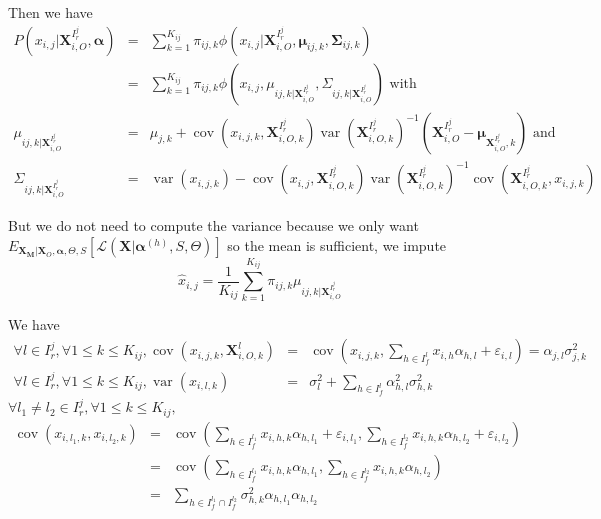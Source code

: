 \documentclass[11pt,a4paper]{report}
\begin{document}
Then we have 
\begin{eqnarray}
	P(x_{i,j}|\boldsymbol{X}_{i,O}^{I_r^j},\boldsymbol{\alpha})&= &\sum_{k=1}^{K_{ij}}\pi_{ij,k}\phi(x_{i,j}|\boldsymbol{X}_{i,O}^{I_r^j},\boldsymbol{\mu}_{ij,k},\boldsymbol{\Sigma}_{ij,k}) \\
	&=&\sum_{k=1}^{K_{ij}}\pi_{ij,k}\phi \left(x_{i,j},\mu_{ij,k|\boldsymbol{X}_{i,O}^{I_r^j}},\Sigma_{ij,k|\boldsymbol{X}_{i,O}^{I_r^j}}\right) \textrm{ with} \\
	\mu_{ij,k|\boldsymbol{X}_{i,O}^{I_r^j}}&=& \mu_{j,k} + \operatorname{cov}(x_{i,j,k},\boldsymbol{X}_{i,O,k}^{I_r^j})\operatorname{var}(\boldsymbol{X}_{i,O,k}^{I_r^j})^{-1}(\boldsymbol{X}_{i,O}^{I_r^j}-\boldsymbol{\mu}_{\boldsymbol{X}_{i,O}^{I_r^j},k})\textrm{ and} \\
	\Sigma_{ij,k|\boldsymbol{X}_{i,O}^{I_r^j}}&=&\operatorname{var}(x_{i,j,k})-\operatorname{cov}(x_{i,j},\boldsymbol{X}_{i,O,k}^{I_r^j})\operatorname{var}(\boldsymbol{X}_{i,O,k}^{I_r^j})^{-1}\operatorname{cov}(\boldsymbol{X}_{i,O,k}^{I_r^j},x_{i,j,k})
\end{eqnarray}
 
But we do not need to compute the variance because we only want $E_{\boldsymbol{X}_{\boldsymbol{M}}|\boldsymbol{X}_O,\boldsymbol{\alpha},\Theta,S}\left[\mathcal{L}(\boldsymbol{X}|\boldsymbol{\alpha}^{(h)},S,\Theta)\right]$ so the mean is sufficient, we impute  
\begin{equation}
	\hat{x}_{i,j}=\frac{1}{K_{ij}}\sum_{k=1}^{K_{ij}}\pi_{ij,k}\mu_{ij,k|\boldsymbol{X}_{i,O}^{I_r^j}}
\end{equation}

We have 
\begin{eqnarray}
	\forall l \in I_r^j,\forall 1\leq k \leq K_{ij}, \operatorname{cov}(x_{i,j,k},\boldsymbol{X}_{i,O,k}^{l})&=&\operatorname{cov}(x_{i,j,k},\sum_{h\in I_f^l}x_{i,h}\alpha_{h,l}+\varepsilon_{i,l})
	=\alpha_{j,l}\sigma_{j,k}^2 \\
	\forall l \in I_r^j,\forall 1\leq k \leq K_{ij}, \operatorname{var}(x_{i,l,k})&=&\sigma_l^2+\sum_{h \in I_f^l}\alpha_{h,l}^2\sigma_{h,k}^2 
	\end{eqnarray}
	$\forall l_1\neq l_2 \in I_r^j,\forall 1\leq k \leq K_{ij},$
	\begin{eqnarray}
	 \operatorname{cov}(x_{i,l_1,k},x_{i,l_2,k})&=&\operatorname{cov}(\sum_{h\in I_f^{l_1}}x_{i,h,k}\alpha_{h,l_1}+\varepsilon_{i,l_1},\sum_{h\in I_f^{l_2}}x_{i,h,k}\alpha_{h,l_2}+\varepsilon_{i,l_2})\\
	&=& \operatorname{cov}(\sum_{h\in I_f^{l_1}}x_{i,h,k}\alpha_{h,l_1},\sum_{h\in I_f^{l_2}}x_{i,h,k}\alpha_{h,l_2}) \\
	&=& \sum_{h \in I_f^{l_1}\cap I_f^{l_2}}\sigma_{h,k}^2\alpha_{h,l_1}\alpha_{h,l_2}
\end{eqnarray}
\end{document}
